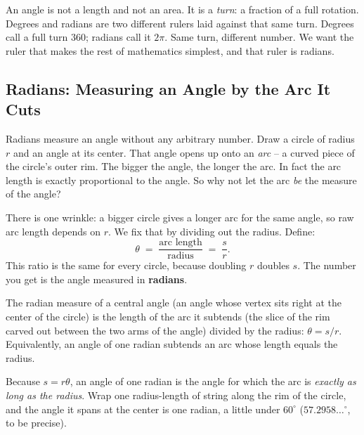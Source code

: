\begin{intuitionbox}
An angle is not a length and not an area. It is a \emph{turn}: a fraction of a full rotation. Degrees and radians are two different rulers laid against that same turn. Degrees call a full turn $360$; radians call it $2\pi$. Same turn, different number. We want the ruler that makes the rest of mathematics simplest, and that ruler is radians.
\end{intuitionbox}

\subsection{Radians: Measuring an Angle by the Arc It Cuts}

Radians measure an angle without any arbitrary number. Draw a circle of radius $r$ and an angle at its center. That angle opens up onto an \emph{arc} -- a curved piece of the circle's outer rim. The bigger the angle, the longer the arc. In fact the arc length is exactly proportional to the angle. So why not let the arc \emph{be} the measure of the angle?

There is one wrinkle: a bigger circle gives a longer arc for the same angle, so raw arc length depends on $r$. We fix that by dividing out the radius. Define:
\[
  \theta \;=\; \frac{\text{arc length}}{\text{radius}} \;=\; \frac{s}{r}.
\]
This ratio is the same for every circle, because doubling $r$ doubles $s$. The number you get is the angle measured in \textbf{radians}.

\begin{definition}[Radian]
\label{ch04:def-radian}
The radian measure of a central angle (an angle whose vertex sits right at the center of the circle) is the length of the arc it subtends (the slice of the rim carved out between the two arms of the angle) divided by the radius: $\theta = s/r$. Equivalently, an angle of one radian subtends an arc whose length equals the radius.
\end{definition}

Because $s = r\theta$, an angle of one radian is the angle for which the arc is \emph{exactly as long as the radius}. Wrap one radius-length of string along the rim of the circle, and the angle it spans at the center is one radian, a little under $60^\circ$ ($57.2958\ldots^\circ$, to be precise).

